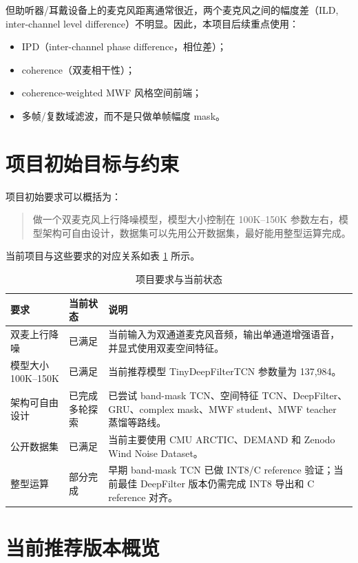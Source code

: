 \documentclass[UTF8,12pt,a4paper]{ctexart}
\begin{document}
但助听器/耳戴设备上的麦克风距离通常很近，两个麦克风之间的幅度差（ILD, inter-channel level difference）不明显。因此，本项目后续重点使用：

\begin{itemize}
  \item IPD（inter-channel phase difference，相位差）；
  \item coherence（双麦相干性）；
  \item coherence-weighted MWF 风格空间前端；
  \item 多帧/复数域滤波，而不是只做单帧幅度 mask。
\end{itemize}

\section{项目初始目标与约束}

项目初始要求可以概括为：

\begin{quote}
做一个双麦克风上行降噪模型，模型大小控制在 100K--150K 参数左右，模型架构可自由设计，数据集可以先用公开数据集，最好能用整型运算完成。
\end{quote}

当前项目与这些要求的对应关系如表 \ref{tab:requirements} 所示。

\begin{table}[H]
\centering
\caption{项目要求与当前状态}
\label{tab:requirements}
\begin{tabularx}{\textwidth}{p{3.8cm}p{3.0cm}X}
\toprule
\textbf{要求} & \textbf{当前状态} & \textbf{说明} \\
\midrule
双麦上行降噪 & 已满足 & 当前输入为双通道麦克风音频，输出单通道增强语音，并显式使用双麦空间特征。 \\
模型大小 100K--150K & 已满足 & 当前推荐模型 TinyDeepFilterTCN 参数量为 137,984。 \\
架构可自由设计 & 已完成多轮探索 & 已尝试 band-mask TCN、空间特征 TCN、DeepFilter、GRU、complex mask、MWF student、MWF teacher 蒸馏等路线。 \\
公开数据集 & 已满足 & 当前主要使用 CMU ARCTIC、DEMAND 和 Zenodo Wind Noise Dataset。 \\
整型运算 & 部分完成 & 早期 band-mask TCN 已做 INT8/C reference 验证；当前最佳 DeepFilter 版本仍需完成 INT8 导出和 C reference 对齐。 \\
\bottomrule
\end{tabularx}
\end{table}

\section{当前推荐版本概览}
\end{document}
